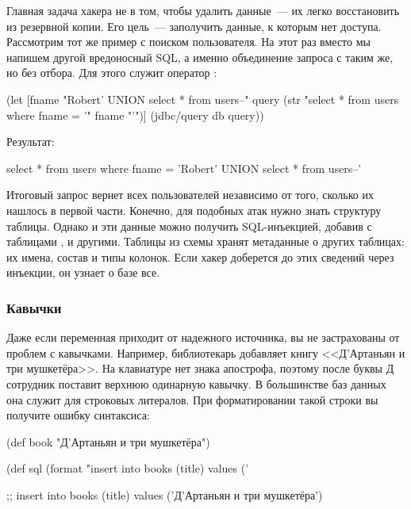 Главная задача хакера не в том, чтобы удалить данные~--- их легко восстановить из резервной копии. Его цель~--- заполучить данные, к которым нет доступа. Рассмотрим тот же пример с поиском пользователя. На этот раз вместо  мы напишем другой вредоносный SQL, а именно объединение запроса с таким же, но без отбора. Для этого служит оператор :

\begin{english}
  \begin{clojure}
(let [fname "Robert' UNION select * from users--"
      query (str "select * from users where fname = '" fname "'")]
  (jdbc/query db query))
  \end{clojure}
\end{english}

Результат:

\begin{english}
  \begin{sql}
select * from users where fname = 'Robert' UNION select * from users--'
  \end{sql}
\end{english}

Итоговый запрос вернет всех пользователей независимо от того, сколько их нашлось в первой части. Конечно, для подобных атак нужно знать структуру таблицы. Однако и эти данные можно получить SQL-инъекцией, добавив  с таблицами ,  и другими. Таблицы из схемы  хранят метаданные о других таблицах: их имена, состав и типы колонок. Если хакер доберется до этих сведений через инъекции, он узнает о базе все.

\subsubsection{Кавычки}

Даже если переменная приходит от надежного источника, вы не застрахованы от проблем с кавычками. Например, библиотекарь добавляет книгу <<Д’Артаньян и три мушкетёра>>. На клавиатуре нет знака апострофа, поэтому после буквы Д сотрудник поставит верхнюю одинарную кавычку. В большинстве баз данных она служит для строковых литералов. При форматировании такой строки вы получите ошибку синтаксиса:

  \begin{clojure}
(def book "Д'Артаньян и три мушкетёра")

(def sql (format "insert into books (title) values ('%

;; insert into books (title) values ('Д'Артаньян и три мушкетёра')
  \end{clojure}


